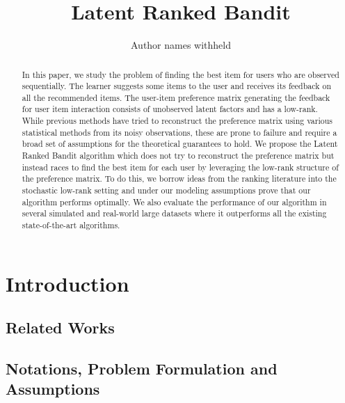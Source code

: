 \documentclass[letterpaper]{article} %
\begin{document}
%
\title{Latent Ranked Bandit}
\author{Author names withheld}
\maketitle
\begin{abstract}
In this paper, we study the problem of finding the best item for users who are observed sequentially. The learner suggests some items to the user and receives its feedback on all the recommended items. The user-item preference matrix generating the feedback for user item interaction consists of unobserved latent factors and has a low-rank. While previous methods have tried to reconstruct the preference matrix using various statistical methods from its noisy observations, these are prone to failure and require a broad set of assumptions for the theoretical guarantees to hold. We propose the  Latent Ranked Bandit algorithm which does not try to reconstruct the preference matrix but instead races to find the best item for each user by leveraging the low-rank structure of the preference matrix. To do this, we borrow ideas from the ranking literature into the stochastic low-rank setting and under our modeling assumptions prove that our algorithm performs optimally. We also evaluate the performance of our algorithm in several simulated and real-world large datasets where it outperforms all the existing state-of-the-art algorithms.
\end{abstract}


\section{Introduction}
\label{intro}



\subsection{Related Works}
\label{related}


\subsection{Notations, Problem Formulation and Assumptions}
\label{probdef}

\end{document}
